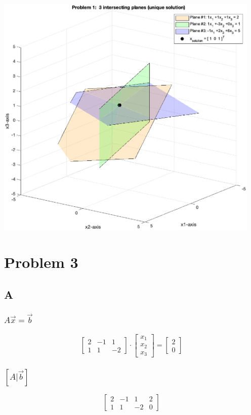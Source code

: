 \documentclass{article}
\begin{document}
\includegraphics [width=5in]{Problem2_2Dplanes_unique_01.eps}


\section*{Problem 3}

\subsection*{A}
\subsubsection*{$A\vec{x}=\vec{b}$}
\[
	\begin{bmatrix}
		2 & -1 & 1  \\
		1 & 1  & -2
	\end{bmatrix}
	\cdot
	\begin{bmatrix}
		x_1 \\
		x_2 \\
		x_3
	\end{bmatrix}
	=
	\begin{bmatrix}
		2 \\ 0
	\end{bmatrix}
\]
\subsubsection*{$[A | \vec{b} ]$}

\[
	\begin{bmatrix}
		2 & -1 & 1  & 2 \\
		1 & 1  & -2 & 0
	\end{bmatrix}
\]
\end{document}
